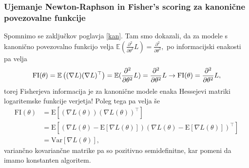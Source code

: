 \documentclass[12pt,a4paper]{amsart}
\theoremstyle{definition} %
\theoremstyle{plain} %
\begin{document}

\subsubsection{Ujemanje Newton-Raphson in Fisher's scoring za kanonične povezovalne funkcije}
Spomnimo se zaključkov poglavja \ref{kan}. Tam smo dokazali, da za modele s kanonično povezovalno funkcijo velja $\mathbb{E}(\frac{\partial^2}{\partial\theta^2}L) = \frac{\partial^2}{\partial\theta^2},$
po informacijski enakosti pa velja 
\begin{equation*}
    \mathrm{FI}(\theta) = \mathbb{E}\left((\nabla L)(\nabla L)^\top\right) = \mathbb{E}(\frac{\partial^2}{\partial\theta^2}L) = \frac{\partial^2}{\partial\theta^2}L \\
    \rightarrow \mathrm{FI}(\theta) = \frac{\partial^2}{\partial\theta^2}L,
\end{equation*}
torej Fisherjeva informacija je za kanonične modele enaka Hessejevi matriki logaritemske funkcije verjetja! Poleg tega pa velja še
\begin{align}
    \mathrm{FI}(\theta) &= \mathrm{E}[(\nabla L(\theta))(\nabla L(\theta))^\top] \nonumber\\
    &= \mathrm{E}[\left(\nabla L(\theta) - \mathrm{E}[\nabla L(\theta)]\right)\left(\nabla L(\theta) - \mathrm{E}[\nabla L(\theta)]\right)^\top] \nonumber \\
    &= \mathrm{Var}[\nabla L(\theta)],
\end{align}
variančno kovariančne matrike pa so pozitivno semidefinitne, kar pomeni da imamo konstanten algoritem.
\end{document}
